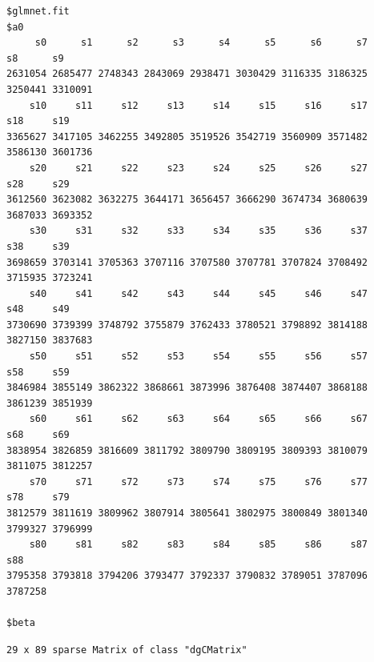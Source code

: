 \documentclass[
]{article}
\begin{document}
\begin{verbatim}
$glmnet.fit
$a0
     s0      s1      s2      s3      s4      s5      s6      s7      s8      s9 
2631054 2685477 2748343 2843069 2938471 3030429 3116335 3186325 3250441 3310091 
    s10     s11     s12     s13     s14     s15     s16     s17     s18     s19 
3365627 3417105 3462255 3492805 3519526 3542719 3560909 3571482 3586130 3601736 
    s20     s21     s22     s23     s24     s25     s26     s27     s28     s29 
3612560 3623082 3632275 3644171 3656457 3666290 3674734 3680639 3687033 3693352 
    s30     s31     s32     s33     s34     s35     s36     s37     s38     s39 
3698659 3703141 3705363 3707116 3707580 3707781 3707824 3708492 3715935 3723241 
    s40     s41     s42     s43     s44     s45     s46     s47     s48     s49 
3730690 3739399 3748792 3755879 3762433 3780521 3798892 3814188 3827150 3837683 
    s50     s51     s52     s53     s54     s55     s56     s57     s58     s59 
3846984 3855149 3862322 3868661 3873996 3876408 3874407 3868188 3861239 3851939 
    s60     s61     s62     s63     s64     s65     s66     s67     s68     s69 
3838954 3826859 3816609 3811792 3809790 3809195 3809393 3810079 3811075 3812257 
    s70     s71     s72     s73     s74     s75     s76     s77     s78     s79 
3812579 3811619 3809962 3807914 3805641 3802975 3800849 3801340 3799327 3796999 
    s80     s81     s82     s83     s84     s85     s86     s87     s88 
3795358 3793818 3794206 3793477 3792337 3790832 3789051 3787096 3787258 

$beta
\end{verbatim}

\begin{verbatim}
29 x 89 sparse Matrix of class "dgCMatrix"
\end{verbatim}
\end{document}

